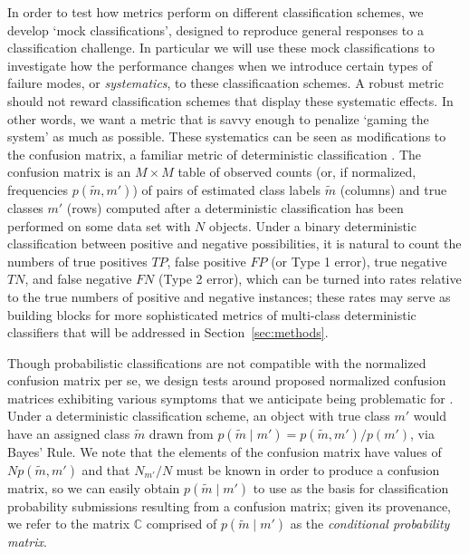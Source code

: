 In order to test how metrics perform on different classification schemes, we develop `mock classifications', designed to reproduce general responses to a classification challenge.
In particular we will use these mock classifications to investigate how the performance changes when we introduce certain types of failure modes, or \textit{systematics}, to these classificaation schemes.
A robust metric should not reward classification schemes that display these systematic effects.
In other words, we want a metric that is savvy enough to penalize `gaming the system' as much as possible.
These systematics can be seen as modifications to the confusion matrix, a familiar metric of deterministic classification \citep{bloom_automating_2012}.
The confusion matrix is an $M \times M$ table of observed counts (or, if normalized, frequencies $p(\tilde{m}, m')$) of pairs of estimated class labels $\tilde{m}$ (columns) and true classes $m'$ (rows) computed after a deterministic classification has been performed on some data set with $N$ objects.
Under a binary deterministic classification between positive and negative possibilities, it is natural to count the numbers of true positives $TP$, false positive $FP$ (or Type 1 error), true negative $TN$, and false negative $FN$ (Type 2 error), which can be turned into rates relative to the true numbers of positive and negative instances; these rates may serve as building blocks for more sophisticated metrics of multi-class deterministic classifiers that will be addressed in Section~\ref{sec:methods}.

Though probabilistic classifications are not compatible with the normalized confusion matrix per se, we design tests around proposed normalized confusion matrices exhibiting various symptoms that we anticipate being problematic for \lsst.
Under a deterministic classification scheme, an object with true class $m'$ would have an assigned class $\tilde{m}$ drawn from $p(\tilde{m} \mid m') = p(\tilde{m}, m') / p(m')$, via Bayes' Rule.
We note that the elements of the confusion matrix have values of $N p(\tilde{m}, m')$ and that $N_{m'} / N$ must be known in order to produce a confusion matrix, so we can easily obtain $p(\tilde{m} \mid m')$ to use as the basis for classification probability submissions resulting from a confusion matrix; given its provenance, we refer to the matrix $\mathbb{C}$ comprised of $p(\tilde{m} \mid m')$ as the \textit{conditional probability matrix}.

